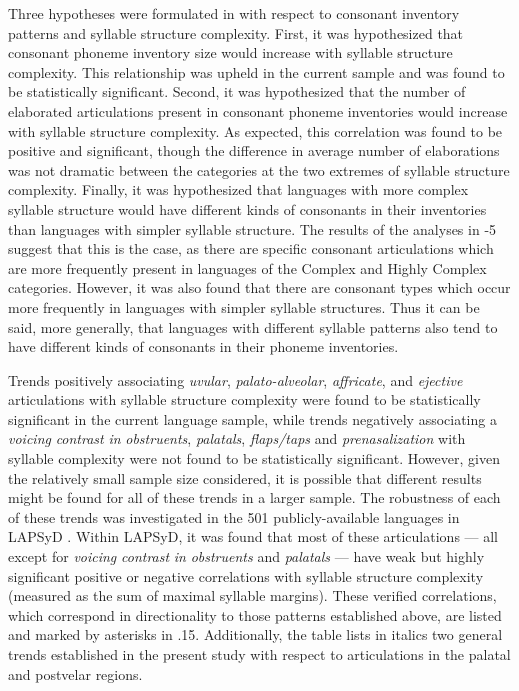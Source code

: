   Three hypotheses were formulated in  with respect to consonant inventory patterns and syllable structure complexity. First, it was hypothesized that consonant phoneme inventory size would increase with syllable structure complexity. This relationship was upheld in the current sample and was found to be statistically significant. Second, it was hypothesized that the number of elaborated articulations present in consonant phoneme inventories would increase with syllable structure complexity. As expected, this correlation was found to be positive and significant, though the difference in average number of elaborations was not dramatic between the categories at the two extremes of syllable structure complexity. Finally, it was hypothesized that languages with more complex syllable structure would have different kinds of consonants in their inventories than languages with simpler syllable structure. The results of the analyses in -5 suggest that this is the case, as there are specific consonant articulations which are more frequently present in languages of the Complex and Highly Complex categories. However, it was also found that there are consonant types which occur more frequently in languages with simpler syllable structures. Thus it can be said, more generally, that languages with different syllable patterns also tend to have different kinds of consonants in their phoneme inventories.



  Trends positively associating \textit{uvular}, \textit{palato-alveolar}, \textit{affricate}, and \textit{ejective} articulations with syllable structure complexity were found to be statistically significant in the current language sample, while trends negatively associating a \textit{voicing} \textit{contrast} \textit{in} \textit{obstruents}, \textit{palatals}, \textit{flaps/taps} and \textit{prenasalization} with syllable complexity were not found to be statistically significant. However, given the relatively small sample size considered, it is possible that different results might be found for all of these trends in a larger sample. The robustness of each of these trends was investigated in the 501 publicly-available languages in LAPSyD \citep{MaddiesonEtAl2013}. Within LAPSyD, it was found that most of these articulations — all except for \textit{voicing} \textit{contrast} \textit{in} \textit{obstruents} and \textit{palatals} — have weak but highly significant positive or negative correlations with syllable structure complexity (measured as the sum of maximal syllable margins). These verified correlations, which correspond in directionality to those patterns established above, are listed and marked by asterisks in .15. Additionally, the table lists in italics two general trends established in the present study with respect to articulations in the palatal and postvelar regions.







